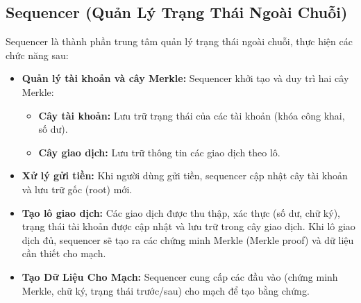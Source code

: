 \subsection{Sequencer (Quản Lý Trạng Thái Ngoài Chuỗi)}
Sequencer là thành phần trung tâm quản lý trạng thái ngoài chuỗi, thực hiện các chức năng sau:
\begin{itemize}
    \item \textbf{Quản lý tài khoản và cây Merkle:} Sequencer khởi tạo và duy trì hai cây Merkle:
    \begin{itemize}
        \item \textbf{Cây tài khoản:} Lưu trữ trạng thái của các tài khoản (khóa công khai, số dư).
        \item \textbf{Cây giao dịch:} Lưu trữ thông tin các giao dịch theo lô.
    \end{itemize}
    \item \textbf{Xử lý gửi tiền:} Khi người dùng gửi tiền, sequencer cập nhật cây tài khoản và lưu trữ gốc (root) mới.
    \item \textbf{Tạo lô giao dịch:} Các giao dịch được thu thập, xác thực (số dư, chữ ký), trạng thái tài khoản được cập nhật và lưu trữ trong cây giao dịch. Khi lô giao dịch đủ, sequencer sẽ tạo ra các chứng minh Merkle (Merkle proof) và dữ liệu cần thiết cho mạch.
    \item \textbf{Tạo Dữ Liệu Cho Mạch:} Sequencer cung cấp các đầu vào (chứng minh Merkle, chữ ký, trạng thái trước/sau) cho mạch để tạo bằng chứng.
\end{itemize}

